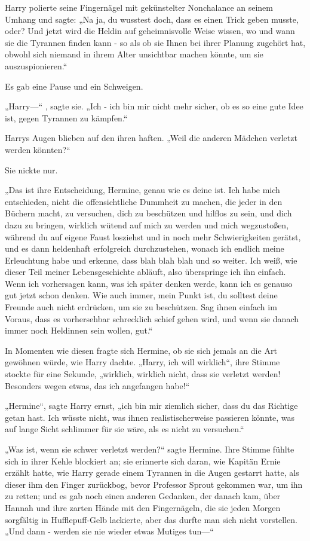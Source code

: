 {Harry polierte seine Fingernägel mit gekünstelter Nonchalance an seinem Umhang und sagte: „Na ja, du wusstest doch, dass es einen Trick geben musste, oder? Und jetzt wird die Heldin auf geheimnisvolle Weise wissen, wo und wann sie die Tyrannen finden kann - so als ob sie Ihnen bei ihrer Planung zugehört hat, obwohl sich niemand in ihrem Alter unsichtbar machen könnte, um sie auszuspionieren.“

Es gab eine Pause und ein Schweigen.

„Harry—“ , sagte sie. „Ich - ich bin mir nicht mehr sicher, ob es so eine gute Idee ist, gegen Tyrannen zu kämpfen.“

Harrys Augen blieben auf den ihren haften. „Weil die anderen Mädchen verletzt werden könnten?“

Sie nickte nur.

„Das ist ihre Entscheidung, Hermine, genau wie es deine ist. Ich habe mich entschieden, nicht die offensichtliche Dummheit zu machen, die jeder in den Büchern macht, zu versuchen, dich zu beschützen und hilflos zu sein, und dich dazu zu bringen, wirklich wütend auf mich zu werden und mich wegzustoßen, während du auf eigene Faust losziehst und in noch mehr Schwierigkeiten gerätst, und es dann heldenhaft erfolgreich durchzustehen, wonach ich endlich meine Erleuchtung habe und erkenne, dass blah blah blah und so weiter. Ich weiß, wie dieser Teil meiner Lebensgeschichte abläuft, also überspringe ich ihn einfach. Wenn ich vorhersagen kann, was ich später denken werde, kann ich es genauso gut jetzt schon denken. Wie auch immer, mein Punkt ist, du solltest deine Freunde auch nicht erdrücken, um sie zu beschützen. Sag ihnen einfach im Voraus, dass es vorhersehbar schrecklich schief gehen wird, und wenn sie danach immer noch Heldinnen sein wollen, gut.“

In Momenten wie diesen fragte sich Hermine, ob sie sich jemals an die Art gewöhnen würde, wie Harry dachte. „Harry, ich will wirklich“, ihre Stimme stockte für eine Sekunde, „wirklich, wirklich nicht, dass sie verletzt werden! Besonders wegen etwas, das ich angefangen habe!“

„Hermine“, sagte Harry ernst, „ich bin mir ziemlich sicher, dass du das Richtige getan hast. Ich wüsste nicht, was ihnen realistischerweise passieren könnte, was auf lange Sicht schlimmer für sie wäre, als es nicht zu versuchen.“

„Was ist, wenn sie schwer verletzt werden?“ sagte Hermine. Ihre Stimme fühlte sich in ihrer Kehle blockiert an; sie erinnerte sich daran, wie Kapitän Ernie erzählt hatte, wie Harry gerade einem Tyrannen in die Augen gestarrt hatte, als dieser ihm den Finger zurückbog, bevor Professor Sprout gekommen war, um ihn zu retten; und es gab noch einen anderen Gedanken, der danach kam, über Hannah und ihre zarten Hände mit den Fingernägeln, die sie jeden Morgen sorgfältig in Hufflepuff-Gelb lackierte, aber das durfte man sich nicht vorstellen. „Und dann - werden sie nie wieder etwas Mutiges tun—“

}

